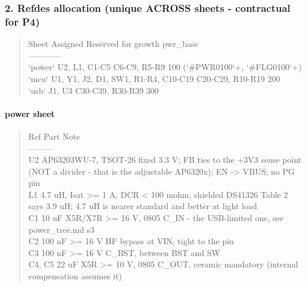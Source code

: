 \documentclass[11pt,a4paper]{article}
\begin{document}
\subsubsection*{2. Refdes allocation (unique ACROSS sheets - contractual for P4)}
\begin{quote}\small\ttfamily\raggedright
\textbar{} Sheet \textbar{} Assigned \textbar{} Reserved for growth \textbar{} pwr\_base \textbar{}\\
\textbar{}---\textbar{}---\textbar{}---\textbar{}---\textbar{}\\
\textbar{} `power` \textbar{} U2, L1, C1-C5 \textbar{} C6-C9, R5-R9 \textbar{} 100 (`\#PWR0100`+, `\#FLG0100`+) \textbar{}\\
\textbar{} `mcu` \textbar{} U1, Y1, J2, D1, SW1, R1-R4, C10-C19 \textbar{} C20-C29, R10-R19 \textbar{} 200 \textbar{}\\
\textbar{} `usb` \textbar{} J1, U3 \textbar{} C30-C39, R30-R39 \textbar{} 300 \textbar{}
\end{quote}
\paragraph*{power sheet}
\begin{quote}\small\ttfamily\raggedright
\textbar{} Ref \textbar{} Part \textbar{} Note \textbar{}\\
\textbar{}---\textbar{}---\textbar{}---\textbar{}\\
\textbar{} U2 \textbar{} AP63203WU-7, TSOT-26 \textbar{} fixed 3.3 V; FB ties to the +3V3 sense point (NOT a divider - that is the adjustable AP6320x); EN -\textgreater{} VBUS; no PG pin \textbar{}\\
\textbar{} L1 \textbar{} 4.7 uH, Isat \textgreater{}= 1 A, DCR \textless{} 100 mohm, shielded \textbar{} DS41326 Table 2 says 3.9 uH; 4.7 uH is nearer standard and better at light load \textbar{}\\
\textbar{} C1 \textbar{} 10 uF X5R/X7R \textgreater{}= 16 V, 0805 \textbar{} C\_IN - the USB-limited one, see power\_tree.md s3 \textbar{}\\
\textbar{} C2 \textbar{} 100 nF \textgreater{}= 16 V \textbar{} HF bypass at VIN, tight to the pin \textbar{}\\
\textbar{} C3 \textbar{} 100 nF \textgreater{}= 16 V \textbar{} C\_BST, between BST and SW \textbar{}\\
\textbar{} C4, C5 \textbar{} 22 uF X5R \textgreater{}= 10 V, 0805 \textbar{} C\_OUT, ceramic mandatory (internal compensation assumes it) \textbar{}
\end{quote}
\end{document}
